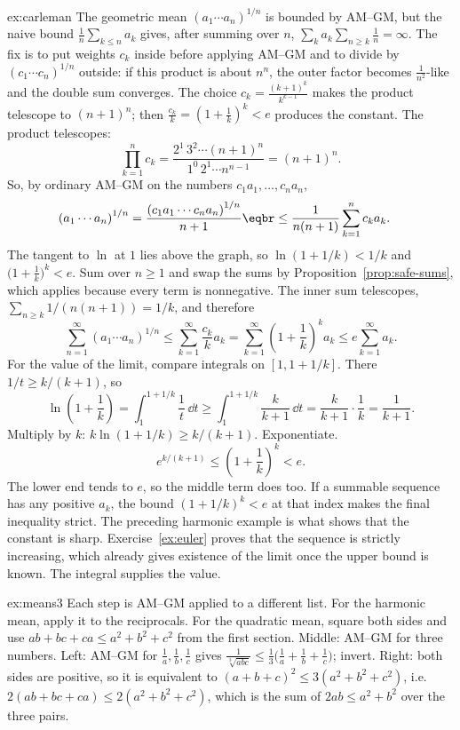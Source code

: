 \begin{solution}{ex:carleman}
\idea The geometric mean $(a_1\cdots a_n)^{1/n}$ is bounded by AM--GM, but the naive bound $\frac1n\sum_{k\le n}a_k$ gives, after summing over $n$, $\sum_ka_k\sum_{n\ge k}\frac1n=\infty$. The fix is to put weights $c_k$ inside before applying AM--GM and to divide by $(c_1\cdots c_n)^{1/n}$ outside: if this product is about $n^n$, the outer factor becomes $\frac1{n^2}$-like and the double sum converges. The choice $c_k=\frac{(k+1)^k}{k^{k-1}}$ makes the product telescope to $(n+1)^n$; then $\frac{c_k}k=\left(1+\frac1k\right)^k<e$ produces the constant.
\writeup The product telescopes:
\[\prod_{k=1}^nc_k=\frac{2^1\,3^2\cdots(n+1)^n}{1^0\,2^1\cdots n^{n-1}}=(n+1)^n.\]
So, by ordinary AM--GM on the numbers $c_1a_1,\dots,c_na_n$,
\[
\begin{aligned}\left(a_1\cdots a_n\right)^{1/n}&=\frac{\left(c_1a_1\cdots c_na_n\right)^{1/n}}{n+1}\eqbr\le\frac1{n(n+1)}\sum_{k=1}^nc_ka_k.\end{aligned}
\]
The tangent to $\ln$ at $1$ lies above the graph, so $\ln(1+1/k)<1/k$ and $\bigl(1+\frac1k\bigr)^k<e$. Sum over $n\ge1$ and swap the sums by Proposition~\ref{prop:safe-sums}, which applies because every term is nonnegative. The inner sum telescopes, $\sum_{n\ge k}1/(n(n+1))=1/k$, and therefore
\[
\sum_{n=1}^\infty\left(a_1\cdots a_n\right)^{1/n}\le\sum_{k=1}^\infty\frac{c_k}ka_k=\sum_{k=1}^\infty\left(1+\frac1k\right)^ka_k\le e\sum_{k=1}^\infty a_k.
\]
For the value of the limit, compare integrals on $[1,1+1/k]$. There $1/t\ge k/(k+1)$, so
\[
\ln\left(1+\frac1k\right)=\int_1^{1+1/k}\frac1t\,\dd t\ge\int_1^{1+1/k}\frac{k}{k+1}\,\dd t=\frac{k}{k+1}\cdot\frac1k=\frac1{k+1}.
\]
Multiply by $k$: $k\ln(1+1/k)\ge k/(k+1)$. Exponentiate.
\[
e^{k/(k+1)}\le\left(1+\frac1k\right)^k<e.
\]
The lower end tends to $e$, so the middle term does too. If a summable sequence has any positive $a_k$, the bound $(1+1/k)^k<e$ at that index makes the final inequality strict. The preceding harmonic example is what shows that the constant is sharp. Exercise~\ref{ex:euler} proves that the sequence is strictly increasing, which already gives existence of the limit once the upper bound is known. The integral supplies the value.
\end{solution}

\begin{solution}{ex:means3}
\idea Each step is AM--GM applied to a different list. For the harmonic mean, apply it to the reciprocals. For the quadratic mean, square both sides and use $ab+bc+ca\le a^2+b^2+c^2$ from the first section.
\writeup Middle: AM--GM for three numbers. Left: AM--GM for $\frac1a,\frac1b,\frac1c$ gives $\frac1{\sqrt[3]{abc}}\le\frac13\bigl(\frac1a+\frac1b+\frac1c\bigr)$; invert. Right: both sides are positive, so it is equivalent to $(a+b+c)^2\le3(a^2+b^2+c^2)$, i.e.\ $2(ab+bc+ca)\le2(a^2+b^2+c^2)$, which is the sum of $2ab\le a^2+b^2$ over the three pairs.
\end{solution}


